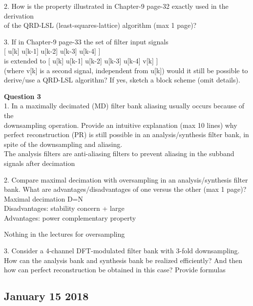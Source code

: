 \documentclass[
  a4paper,
  ,captions=tableheading
]{scrartcl}
\begin{document}
2. How is the property illustrated in Chapter-9 page-32 exactly used in
the derivation\\
of the QRD-LSL (least-squares-lattice) algorithm (max 1 page)?

3. If in Chapter-9 page-33 the set of filter input signals\\
{[} u{[}k{]} u{[}k-1{]} u{[}k-2{]} u{[}k-3{]} u{[}k-4{]} {]}\\
is extended to {[} u{[}k{]} u{[}k-1{]} u{[}k-2{]} u{[}k-3{]} u{[}k-4{]}
v{[}k{]} {]}\\
(where v{[}k{]} is a second signal, independent from u{[}k{]}) would it
still be possible to\\
derive/use a QRD-LSL algorithm? If yes, sketch a block scheme (omit
details).

\textbf{Question 3}\\
1. In a maximally decimated (MD) filter bank aliasing usually occurs
because of the\\
downsampling operation. Provide an intuitive explanation (max 10 lines)
why\\
perfect reconstruction (PR) is still possible in an analysis/synthesis
filter bank, in\\
spite of the downsampling and aliasing.\\
The analysis filters are anti-aliasing filters to prevent aliasing in
the subband signals after decimation

2. Compare maximal decimation with oversampling in an analysis/synthesis
filter\\
bank. What are advantages/disadvantages of one versus the other (max 1
page)?\\
Maximal decimation D=N\\
Disadvantages: stability concern + large\\
Advantages: power complementary property

Nothing in the lectures for oversampling

3. Consider a 4-channel DFT-modulated filter bank with 3-fold
downsampling.\\
How can the analysis bank and synthesis bank be realized efficiently?
And then\\
how can perfect reconstruction be obtained in this case? Provide
formulas

\subsection{January 15 2018}\label{january-15-2018}
\end{document}
